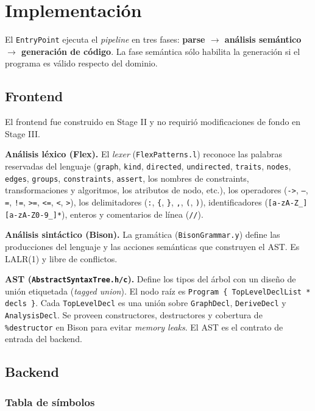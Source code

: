\documentclass[11pt,a4paper]{article}
\newcommand{\code}[1]{\texttt{#1}}
\begin{document}
\section{Implementación}

El \code{EntryPoint} ejecuta el \emph{pipeline} en tres fases:
\textbf{parse $\rightarrow$ análisis semántico $\rightarrow$ generación de
código}. La fase semántica sólo habilita la generación si el programa es
válido respecto del dominio.

\subsection{Frontend}

El frontend fue construido en Stage II y no requirió modificaciones de fondo en
Stage III.

\textbf{Análisis léxico (Flex).} El \emph{lexer} (\code{FlexPatterns.l})
reconoce las palabras reservadas del lenguaje (\code{graph}, \code{kind},
\code{directed}, \code{undirected}, \code{traits}, \code{nodes}, \code{edges},
\code{groups}, \code{constraints}, \code{assert}, los nombres de constraints,
transformaciones y algoritmos, los atributos de nodo, etc.), los operadores
(\code{->}, \code{--}, \code{=}, \code{!=}, \code{>=}, \code{<=}, \code{<},
\code{>}), los delimitadores (\code{:}, \code{\{}, \code{\}}, \code{,},
\code{(}, \code{)}), identificadores (\code{[a-zA-Z\_][a-zA-Z0-9\_]*}),
enteros y comentarios de línea (\code{//}).

\textbf{Análisis sintáctico (Bison).} La gramática (\code{BisonGrammar.y})
define las producciones del lenguaje y las acciones semánticas que construyen el
AST. Es LALR(1) y libre de conflictos.

\textbf{AST (\code{AbstractSyntaxTree.h/c}).} Define los tipos del árbol con un
diseño de unión etiquetada (\emph{tagged union}). El nodo raíz es
\code{Program \{ TopLevelDeclList * decls \}}. Cada \code{TopLevelDecl} es una
unión sobre \code{GraphDecl}, \code{DeriveDecl} y \code{AnalysisDecl}. Se
proveen constructores, destructores y cobertura de \code{\%destructor} en Bison
para evitar \emph{memory leaks}. El AST es el contrato de entrada del backend.

\subsection{Backend}

\subsubsection{Tabla de símbolos}
\end{document}
